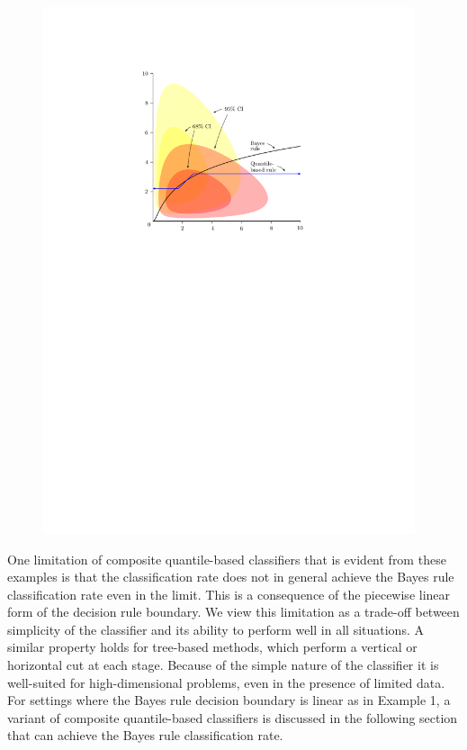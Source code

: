 \begin{figure}[ht]
\begin{minipage}[t]{0.49\linewidth}
    \includegraphics[width=0.975\textwidth]{gamma_cqc}
  \end{minipage}
\end{figure}

One limitation of composite quantile-based classifiers that is evident from
these examples is that the classification rate does not in general achieve the
Bayes rule classification rate even in the limit.  This is a consequence of the
piecewise linear form of the decision rule boundary.  We view this limitation as
a trade-off between simplicity of the classifier and its ability to perform well
in all situations.  A similar property holds for tree-based methods, which
perform a vertical or horizontal cut at each stage.  Because of the simple
nature of the classifier it is well-suited for high-dimensional problems, even
in the presence of limited data.  For settings where the Bayes rule decision
boundary is linear as in Example 1, a variant of composite quantile-based
classifiers is discussed in the following section that can achieve the Bayes
rule classification rate.



